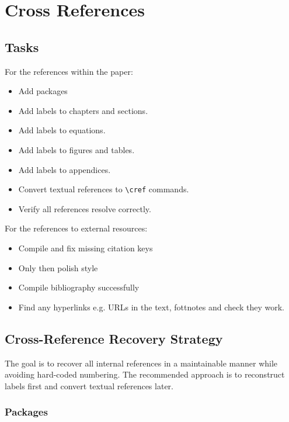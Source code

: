 \documentclass{article}
\newcommand{\done}{\textcolor{green!60!black}{\ding{51}}}
\newcommand{\pending}{$\square$}
\begin{document}
\section{\done Cross References}

\subsection{Tasks}

For the references within the paper:

\begin{itemize}
\item[\pending] Add packages
\item[\pending] Add labels to chapters and sections.
\item[\pending] Add labels to equations.
\item[\pending] Add labels to figures and tables.
\item[\pending] Add labels to appendices.
\item[\pending] Convert textual references to \texttt{\textbackslash cref} commands.
\item[\pending] Verify all references resolve correctly.
\end{itemize}

For the references to external resources:
\begin{itemize}
\item[\pending] Compile and fix missing citation keys
\item[\pending] Only then polish style
\item[\pending] Compile bibliography successfully
\item[\pending] Find any hyperlinks e.g. URLs in the text, fottnotes and check they work.
\end{itemize}


\subsection*{Cross-Reference Recovery Strategy}

The goal is to recover all internal references in a maintainable manner while avoiding
hard-coded numbering. The recommended approach is to reconstruct labels first and
convert textual references later.

\subsubsection*{Packages}
\end{document}
